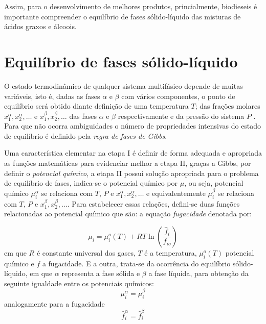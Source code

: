 Assim, para o desenvolvimento de melhores produtos, princialmente, biodieseis é importante compreender o equilíbrio de fases sólido-líquido das misturas de ácidos graxos e álcoois.

\section{Equilíbrio de fases sólido-líquido}
	
O estado termodinâmico de qualquer sistema multifásico depende de muitas variáveis, isto é, dadas as fases $\alpha$ e $\beta$ com vários componentes, o ponto de equilíbrio será obtido diante definição de uma temperatura $T$; das frações molares $x_{1}^{\alpha}, x_{2}^{\alpha}, \ldots$ e $x_{1}^{\beta}, x_{2}^{\beta}, \ldots$ das fases $\alpha$ e $\beta$ respectivamente e da pressão do sistema $P$ . Para que não ocorra ambiguidades o número de propriedades intensivas do estado de equilíbrio é definido pela \textit{regra de fases de Gibbs}. \cite{Prausnitz}
	

	
Uma característica elementar na etapa I é definir de forma adequada e apropriada as funções matemáticas para evidenciar melhor a etapa II, graças a Gibbs, por definir o \textit{potencial químico}, a etapa II possui solução apropriada para o problema de equilíbrio de fases, indica-se o potencial químico por $\mu$, ou seja, potencial químico $\mu_{i}^{\alpha}$ se relaciona com $T$, $P$ e $x_{1}^{\alpha}, x_{2}^{\alpha}, \ldots$ e equivalentemente $\mu_{i}^{\beta}$ se relaciona com $T$, $P$ e $x_{1}^{\beta}, x_{2}^{\beta}, \ldots$. Para estabelecer essas relações, defini-se duas funções relacionadas ao potencial químico que são: a equação \textit{fugacidade} denotada por:
	
	\begin{equation}\label{eq:fugacidade1}
	\mu_{i}=\mu_{i}^{o}(T)+RT\ln\left(\dfrac{\widehat{f}_ {i}}{f_{io}}\right)
	\end{equation}
	em que $R$ é constante universal dos gases, $T$ é a temperatura, $\mu_{i}^{o}(T)$ potencial químico e $f$ a fugacidade. 
	E a outra, trata-se da ocorrência do equilíbrio sólido-líquido, em que $\alpha$ representa a fase sólida e $\beta$ a fase líquida, para obtenção da seguinte igualdade entre os potenciais químicos:
	\begin{equation}\label{eq:equilibrio1}
	\mu_{i}^{\alpha}=\mu_{i}^{\beta}
	\end{equation}
	analogamente para a fugacidade
	\begin{equation}
	\widehat{f}_ {i}^{\alpha}=\widehat{f}_ {i}^{\beta}
	\end{equation}
	
